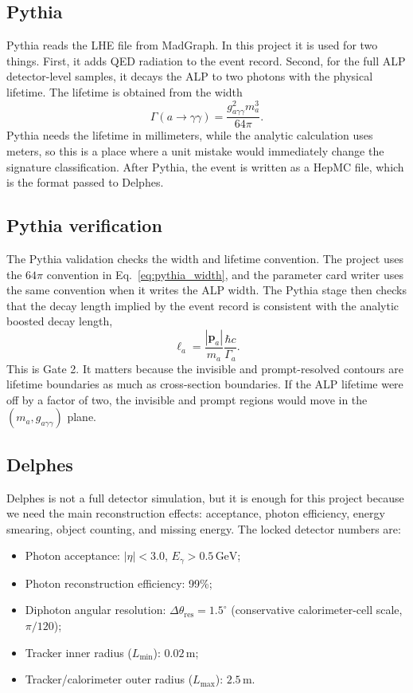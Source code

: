 \documentclass[12pt,a4paper]{article}
\begin{document}
\subsection{Pythia}

Pythia reads the LHE file from MadGraph. In this project it is used for two
things. First, it adds QED radiation to the event record. Second, for the full
ALP detector-level samples, it decays the ALP to two photons with the physical
lifetime. The lifetime is obtained from the width
\begin{equation}
    \Gamma(a\to\gamma\gamma)
    =
    \frac{g_{a\gamma\gamma}^2m_{a}^3}{64\pi}.
    \label{eq:pythia_width}
\end{equation}
Pythia needs the lifetime in millimeters, while the analytic calculation uses
meters, so this is a place where a unit mistake would immediately change the
signature classification. After Pythia, the event is written as a HepMC file,
which is the format passed to Delphes.

\subsection{Pythia verification}

The Pythia validation checks the width and lifetime convention. The project
uses the $64\pi$ convention in Eq.~\eqref{eq:pythia_width}, and the parameter
card writer uses the same convention when it writes the ALP width. The Pythia
stage then checks that the decay length implied by the event record is
consistent with the analytic boosted decay length,
\begin{equation}
    \ell_a=\frac{|\mathbf{p}_a|}{m_{a}}\frac{\hbar c}{\Gamma_a}.
    \label{eq:pythia_decay_length_check}
\end{equation}
This is Gate 2. It matters because the invisible and prompt-resolved contours
are lifetime boundaries as much as cross-section boundaries. If the ALP
lifetime were off by a factor of two, the invisible and prompt regions would
move in the $(m_{a},g_{a\gamma\gamma})$ plane.

\subsection{Delphes}

Delphes is not a full detector simulation, but it is enough for this project
because we need the main reconstruction effects: acceptance, photon efficiency,
energy smearing, object counting, and missing energy. The locked detector
numbers are:
\begin{itemize}
    \item Photon acceptance: $|\eta| < 3.0$, $E_\gamma > 0.5\,\text{GeV}$;
    \item Photon reconstruction efficiency: 99\%;
    \item Diphoton angular resolution: $\Delta\theta_\mathrm{res} = 1.5^\circ$
    (conservative calorimeter-cell scale, $\pi/120$);
    \item Tracker inner radius ($L_\mathrm{min}$): $0.02\,\text{m}$;
    \item Tracker/calorimeter outer radius ($L_\mathrm{max}$): $2.5\,\text{m}$.
\end{itemize}
\end{document}
